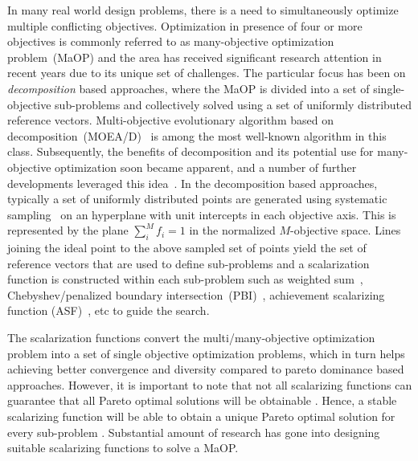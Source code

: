 \documentclass{sig-alternate}
\begin{document}
In many real world design problems, there is a need to simultaneously optimize multiple conflicting objectives. Optimization in presence of four or more objectives is commonly referred to as many-objective optimization problem~(MaOP) and the area has received significant research attention in recent years due to its unique set of challenges. The particular focus has been on \emph{decomposition} based approaches, where the MaOP is divided into a set of single-objective sub-problems and collectively solved using a set of uniformly distributed reference vectors. Multi-objective evolutionary algorithm based on decomposition~(MOEA/D)~\cite{zhang2007moead} is among the most well-known algorithm in this class. Subsequently, the benefits of decomposition and its potential use for many-objective optimization soon became apparent, and a number of further developments leveraged this idea~\cite{trivedisurvey}. In the decomposition based approaches, typically a set of uniformly distributed points are generated using systematic sampling~\cite{das1998normal} on an hyperplane with unit intercepts in each objective axis. This is represented by the plane $\sum^{M}_i{f_i}=1$ in the normalized $M$-objective space. Lines joining the ideal point to the above sampled set of points yield the set of reference vectors that are used to define sub-problems and a scalarization function is constructed within each sub-problem such as weighted sum~\cite{miettinen2012nonlinear, Voss2008}, Chebyshev/penalized boundary intersection~(PBI)~\cite{zhang2007moead}, achievement scalarizing function (ASF)~\cite{miettinen2012nonlinear, Yuan2016many}, etc to guide the search.

The scalarization functions convert the multi/many-objective optimization problem into a set of single objective optimization problems, which in turn helps achieving better convergence and diversity compared to pareto dominance based approaches. 
However, it is important to note that not all scalarizing functions can guarantee that all Pareto optimal solutions will be obtainable \cite{miettinen2012nonlinear}. Hence, a stable scalarizing function will be able to obtain a unique Pareto optimal solution for every sub-problem \cite{giakiozis2015}. Substantial amount of research has gone into designing suitable scalarizing functions to solve a MaOP. 
\end{document}
